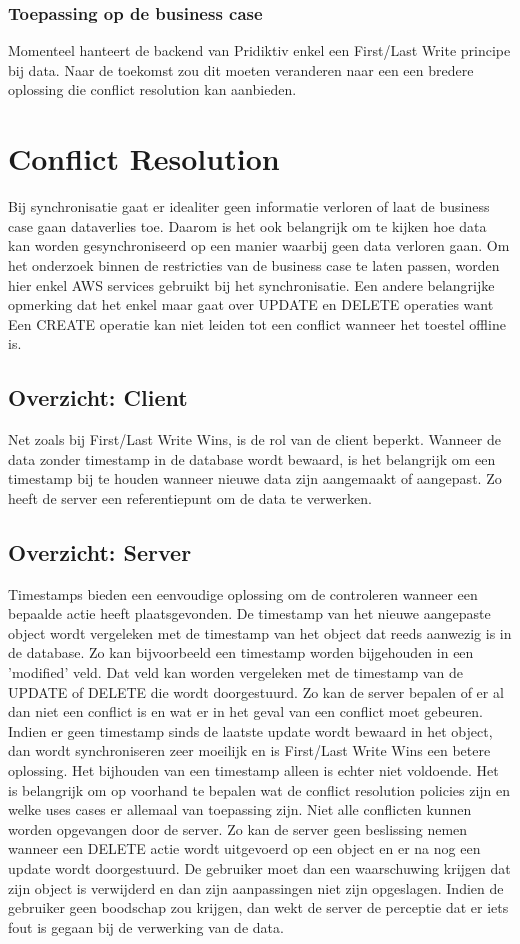 \subsubsection{Toepassing op de business case}
Momenteel hanteert de backend van Pridiktiv enkel een First/Last Write principe bij data. Naar de toekomst zou dit moeten veranderen naar een een bredere oplossing die conflict resolution kan aanbieden.

\section{Conflict Resolution}
Bij synchronisatie gaat er idealiter geen informatie verloren of laat de business case gaan dataverlies toe. Daarom is het ook belangrijk om te kijken hoe data kan worden gesynchroniseerd op een manier waarbij geen data verloren gaan. Om het onderzoek binnen de restricties van de business case te laten passen, worden hier enkel AWS services gebruikt bij het synchronisatie. Een andere belangrijke opmerking dat het enkel maar gaat over UPDATE en DELETE operaties want Een CREATE operatie kan niet leiden tot een conflict wanneer het toestel offline is.
\subsection{Overzicht: Client}
Net zoals bij First/Last Write Wins, is de rol van de client beperkt. Wanneer de data zonder timestamp in de database wordt bewaard, is het belangrijk om een timestamp bij te houden wanneer nieuwe data zijn aangemaakt of aangepast. Zo heeft de server een referentiepunt om de data te verwerken.
\subsection{Overzicht: Server}
Timestamps bieden een eenvoudige oplossing om de controleren wanneer een bepaalde actie heeft plaatsgevonden. De timestamp van het nieuwe aangepaste object wordt vergeleken met de timestamp van het object dat reeds aanwezig is in de database. Zo kan bijvoorbeeld een timestamp worden bijgehouden in een 'modified' veld. Dat veld kan worden vergeleken met de timestamp van de UPDATE of DELETE die wordt doorgestuurd. Zo kan de server bepalen of er al dan niet een conflict is en wat er in het geval van een conflict moet gebeuren. Indien er geen timestamp sinds de laatste update wordt bewaard in het object, dan wordt synchroniseren zeer moeilijk en is First/Last Write Wins een betere oplossing. Het bijhouden van een timestamp alleen is echter niet voldoende. Het is belangrijk om op voorhand te bepalen wat de conflict resolution policies zijn en welke uses cases er allemaal van toepassing zijn. Niet alle conflicten kunnen worden opgevangen door de server. Zo kan de server geen beslissing nemen wanneer een DELETE actie wordt uitgevoerd op een object en er na nog een update wordt doorgestuurd. De gebruiker moet dan een waarschuwing krijgen dat zijn object is verwijderd en dan zijn aanpassingen niet zijn opgeslagen. Indien de gebruiker geen boodschap zou krijgen, dan wekt de server de perceptie dat er iets fout is gegaan bij de verwerking van de data.
